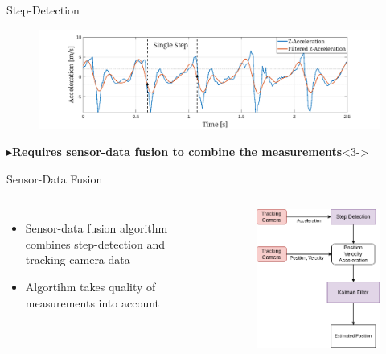 \documentclass[aspectratio=169,handout]{beamer}
\begin{document}
{\begin{frame}{Step-Detection}
		\begin{figure}
			\centering
			\includegraphics[width=0.9\linewidth]{../Conference_Paper/WalkAcceleration}
		\end{figure}
		
		\begin{alert}{$\blacktriangleright$\textbf{Requires sensor-data fusion to combine the measurements}}<3->
		\end{alert}
		
		
		
	\end{frame}

	
	\begin{frame}{Sensor-Data Fusion}
		\begin{columns}
				\vspace{-3.5cm}
				\begin{itemize}
				\item<2-> Sensor-data fusion algorithm combines step-detection and tracking camera data
				\item<3-> Algortihm takes quality of measurements into account
			\end{itemize}
			\begin{figure}
				\centering
				\includegraphics[height=0.8\textheight]{schema1.png}
			\end{figure}
		\end{columns}
	

\end{frame}}
\end{document}
